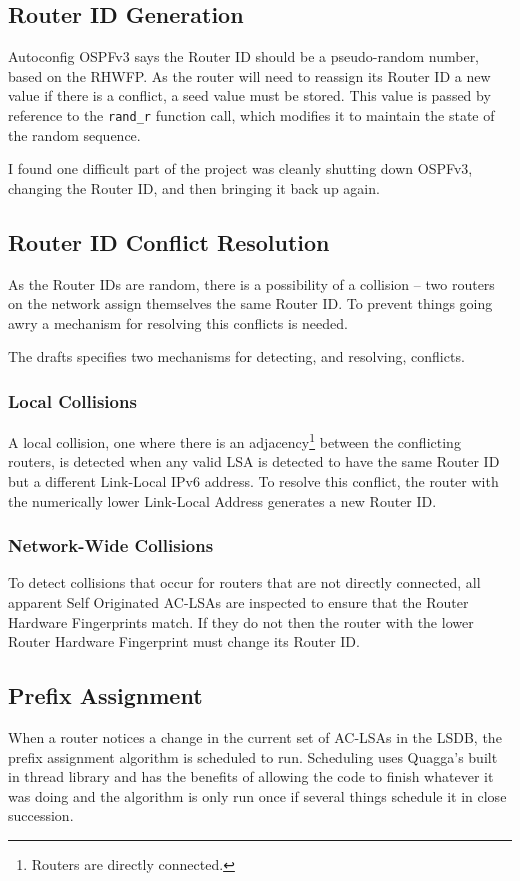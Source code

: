 \documentclass[12pt]{report}
\begin{document}
\subsection{Router ID Generation}
Autoconfig OSPFv3 says the Router ID should be a pseudo-random number, based on
the RHWFP\@. As the router will need to reassign its Router ID a new value if
there is a conflict, a seed value must be stored. This value is passed by
reference to the \texttt{rand\_r} function call, which modifies it to maintain
the state of the random sequence.

I found one difficult part of the project was cleanly shutting down OSPFv3,
changing the Router ID, and then bringing it back up again. 

\subsection{Router ID Conflict Resolution}
As the Router IDs are random, there is a possibility of
a collision -- two routers on the network assign themselves the same Router
ID\@. To prevent things going awry a mechanism for resolving this conflicts is needed. 

The drafts specifies two mechanisms for detecting, and resolving,
conflicts. 

\subsubsection{Local Collisions}
A local collision, one where there is an adjacency\footnote{Routers are
directly connected.} between the conflicting routers, is detected when any
valid LSA is detected to have the same Router ID but a different Link-Local
IPv6 address. To resolve this conflict, the router with the numerically lower
Link-Local Address generates a new Router ID\@. 

\subsubsection{Network-Wide Collisions}
To detect collisions that occur for routers that are not directly connected,
all apparent Self Originated AC-LSAs are inspected to ensure that the Router
Hardware Fingerprints match. If they do not then the router with the lower
Router Hardware Fingerprint must change its Router ID.

\subsection{Prefix Assignment}
When a router notices a change in the current set of AC-LSAs in the LSDB, the
prefix assignment algorithm is scheduled to run. Scheduling uses Quagga's built
in thread library and has the benefits of allowing the code to finish whatever
it was doing and the algorithm is only run once if several things schedule it
in close succession.
\end{document}
